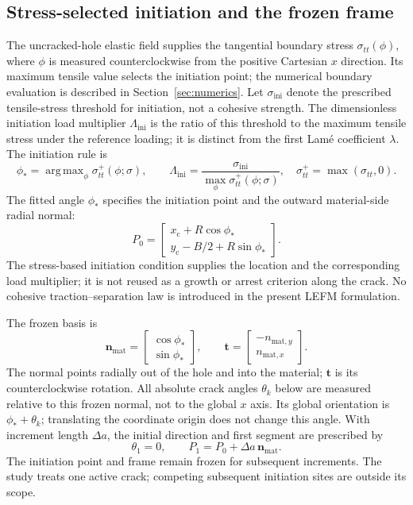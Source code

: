 \documentclass[11pt]{article}
\begin{document}
\subsection{Stress-selected initiation and the frozen frame}
The uncracked-hole elastic field supplies the tangential boundary stress
$\sigma_{tt}(\phi)$, where $\phi$ is measured counterclockwise from the
positive Cartesian $x$ direction. Its maximum tensile value selects the
initiation point; the numerical boundary evaluation is described in
Section~\ref{sec:numerics}. Let $\sigma_{\mathrm{ini}}$ denote the
prescribed tensile-stress threshold for initiation, not a cohesive
strength. The dimensionless initiation load multiplier
$\Lambda_{\mathrm{ini}}$ is the ratio of this threshold to the maximum
tensile stress under the reference loading; it is distinct from the
first Lam\'e coefficient $\lambda$. The initiation rule is
\begin{equation}
 \phi_* = \mathop{\operatorname{arg\,max}}_\phi
      \sigma_{tt}^{+}(\phi;\sigma),\qquad
 \Lambda_{\mathrm{ini}}=
      \frac{\sigma_{\mathrm{ini}}}{\max_\phi\sigma_{tt}^{+}(\phi;\sigma)},
 \quad \sigma_{tt}^{+}=\max(\sigma_{tt},0).\label{eq:initiation}
\end{equation}
The fitted angle $\phi_*$ specifies the initiation point and the
outward material-side radial normal:
\begin{equation}
 P_0=\begin{bmatrix}x_{\mathrm{c}}+R\cos\phi_*\\
                     y_{\mathrm{c}}-B/2+R\sin\phi_*
     \end{bmatrix}.
 \label{eq:mouth}
\end{equation}
The stress-based initiation condition supplies the location and the
corresponding load multiplier; it is not reused as a growth or arrest
criterion along the crack. No cohesive traction--separation law is
introduced in the present LEFM formulation.

The frozen basis is
\begin{equation}
 \bm n_{\mathrm{mat}}=
  \begin{bmatrix}\cos\phi_*\\\sin\phi_*\end{bmatrix},
 \qquad
 \bm t=\begin{bmatrix}-n_{\mathrm{mat},y}\\n_{\mathrm{mat},x}\end{bmatrix}.
 \label{eq:frozenframe}
\end{equation}
The normal points radially out of the hole and into the material; $\bm t$
is its counterclockwise rotation. All absolute crack angles $\theta_k$
below are measured relative to this frozen normal, not to the global
$x$ axis. Its global orientation is $\phi_*+\theta_k$; translating the
coordinate origin does not change this angle. With increment length $\Delta a$, the initial direction and
first segment are prescribed by
\begin{equation}
 \theta_1=0,\qquad
 P_1=P_0+\Delta a\,\bm n_{\mathrm{mat}}.\label{eq:first}
\end{equation}
The initiation point and frame remain frozen for subsequent increments.
The study treats one active crack; competing subsequent initiation sites
are outside its scope.
\end{document}
